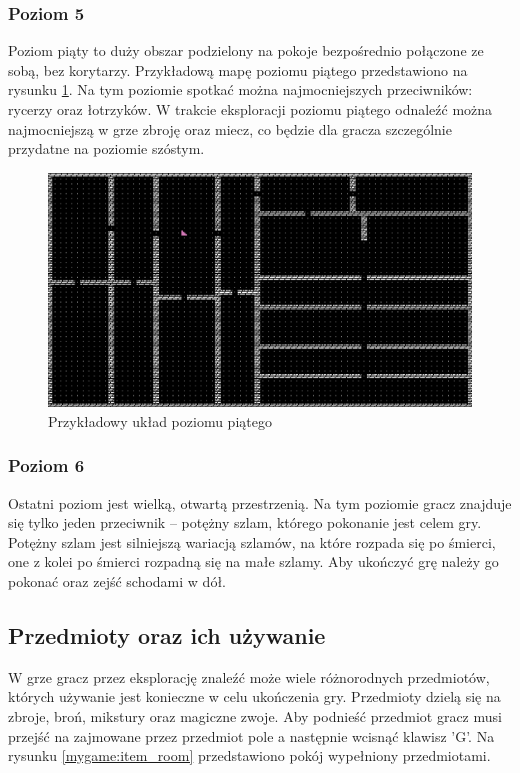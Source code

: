 \documentclass[12pt,twoside]{article}
\begin{document}
\subsubsection{Poziom 5}
Poziom piąty to duży obszar podzielony na pokoje bezpośrednio połączone ze sobą, bez korytarzy. Przykładową mapę poziomu piątego przedstawiono na rysunku \ref{mygame:map5}. Na tym poziomie spotkać można najmocniejszych przeciwników: rycerzy oraz łotrzyków. W trakcie eksploracji poziomu piątego odnaleźć można najmocniejszą w grze zbroję oraz miecz, co będzie dla gracza szczególnie przydatne na poziomie szóstym.

\FloatBarrier
\begin{figure}[ht]
	\centering
	\includegraphics[width=12cm]{images/mygame/map5.png}
	\caption{Przykładowy układ poziomu piątego}
	\label{mygame:map5}
\end{figure}
\FloatBarrier


\subsubsection{Poziom 6}
Ostatni poziom jest wielką, otwartą przestrzenią. Na tym poziomie gracz znajduje się tylko jeden przeciwnik -- potężny szlam, którego pokonanie jest celem gry. Potężny szlam jest silniejszą wariacją szlamów, na które rozpada się po śmierci, one z kolei po śmierci rozpadną się na małe szlamy. Aby ukończyć grę należy go pokonać oraz zejść schodami w dół.


\subsection{Przedmioty oraz ich używanie}
W grze gracz przez eksplorację znaleźć może wiele różnorodnych przedmiotów, których używanie jest konieczne w celu ukończenia gry. Przedmioty dzielą się na zbroje, broń, mikstury oraz magiczne zwoje. Aby podnieść przedmiot gracz musi przejść na zajmowane przez przedmiot pole a następnie wcisnąć klawisz 'G'. Na rysunku \ref{mygame:item_room} przedstawiono pokój wypełniony przedmiotami.
\end{document}
